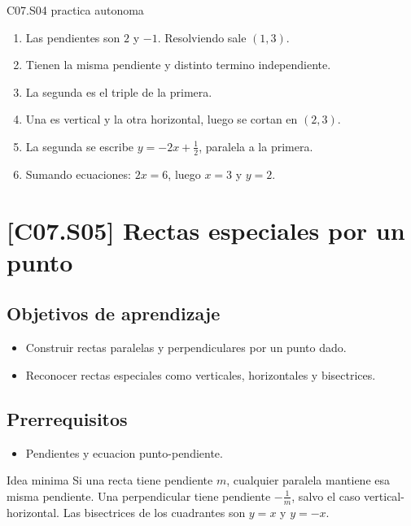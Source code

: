 \begin{fullsolution}{C07.S04 practica autonoma}
\begin{enumerate}[label=\textbf{PX-C07.S04-\arabic*:}, leftmargin=*]
  \item Las pendientes son \(2\) y \(-1\). Resolviendo sale \((1,3)\).
  \item Tienen la misma pendiente y distinto termino independiente.
  \item La segunda es el triple de la primera.
  \item Una es vertical y la otra horizontal, luego se cortan en \((2,3)\).
  \item La segunda se escribe \(y=-2x+\frac{1}{2}\), paralela a la primera.
  \item Sumando ecuaciones: \(2x=6\), luego \(x=3\) y \(y=2\).
\end{enumerate}
\end{fullsolution}

\section{[C07.S05] Rectas especiales por un punto}

\subsection*{Objetivos de aprendizaje}
\begin{itemize}
  \item Construir rectas paralelas y perpendiculares por un punto dado.
  \item Reconocer rectas especiales como verticales, horizontales y bisectrices.
\end{itemize}

\subsection*{Prerrequisitos}
\begin{itemize}
  \item Pendientes y ecuacion punto-pendiente.
\end{itemize}

\begin{theorybox}{Idea minima}
Si una recta tiene pendiente \(m\), cualquier paralela mantiene esa misma pendiente. Una
perpendicular tiene pendiente \(-\frac{1}{m}\), salvo el caso vertical-horizontal. Las
bisectrices de los cuadrantes son \(y=x\) y \(y=-x\).
\end{theorybox}

